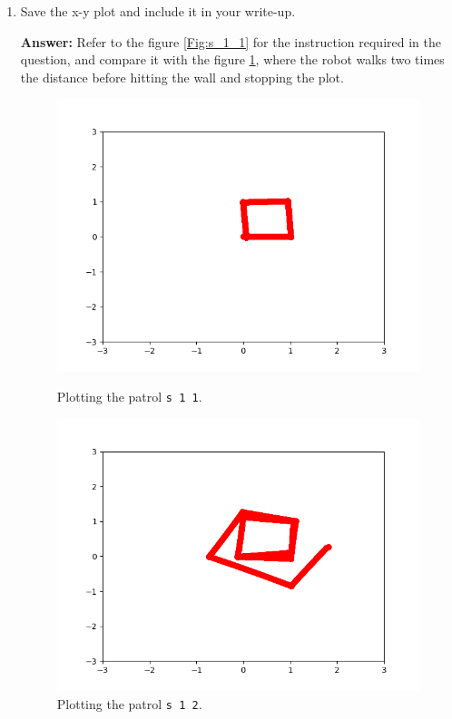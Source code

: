 \documentclass[12pt]{article}
\begin{document}
\begin{enumerate}
\begin{enumerate}
        \item Save the x-y plot and include it in your write-up.
        
        \textbf{Answer: }Refer to the figure \ref{Fig:s_1_1} for the instruction required in the question, and compare it with the figure \ref{Fig:s_1_2}, where the robot walks two times the distance before hitting the wall and stopping the plot.

        \begin{figure}[!htb]
          \begin{minipage}{0.48\textwidth}
            \centering
            \includegraphics[width=\linewidth]{images/patrol_plot_1.png}\vspace{-10pt}
            \caption{Plotting the patrol \texttt{s 1 1}.}\label{Fig:s_1_1}
          \end{minipage}\hfill
          \begin{minipage}{0.48\textwidth}
            \centering
            \includegraphics[width=\linewidth]{images/patrol_plot_2.png}\vspace{-10pt}
            \caption{Plotting the patrol \texttt{s 1 2}.}\label{Fig:s_1_2}
          \end{minipage}
       \end{figure}


\end{enumerate}
\end{enumerate}
\end{document}

